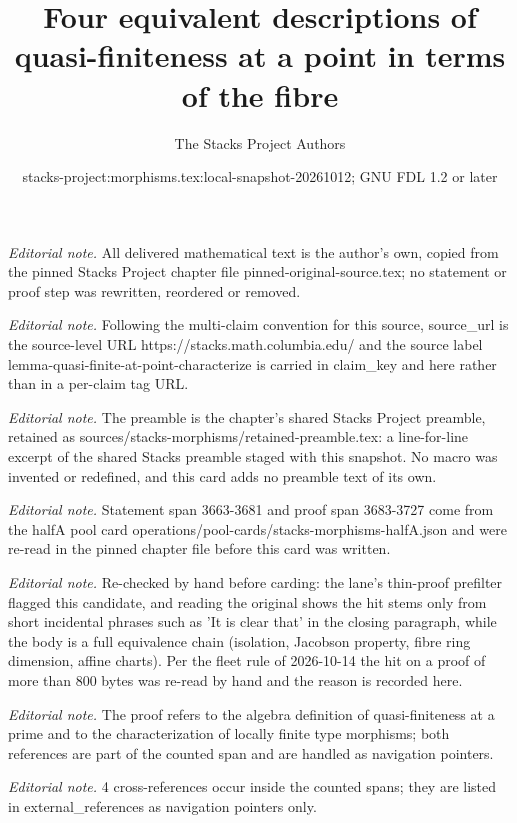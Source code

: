 \documentclass[10pt,a4paper]{amsart}
\title{Four equivalent descriptions of quasi-finiteness at a point in terms of the fibre}
\author{The Stacks Project Authors}
\date{stacks-project:morphisms.tex:local-snapshot-20261012; GNU FDL 1.2 or later}
\theoremstyle{plain}
\theoremstyle{definition}
\theoremstyle{remark}
\numberwithin{equation}{subsection}
\begin{document}
\maketitle
\noindent\textit{Editorial note.} All delivered mathematical text is the author's own, copied from the pinned Stacks Project chapter file pinned-original-source.tex; no statement or proof step was rewritten, reordered or removed.\par\medskip
\noindent\textit{Editorial note.} Following the multi-claim convention for this source, source\_url is the source-level URL https://stacks.math.columbia.edu/ and the source label lemma-quasi-finite-at-point-characterize is carried in claim\_key and here rather than in a per-claim tag URL.\par\medskip
\noindent\textit{Editorial note.} The preamble is the chapter's shared Stacks Project preamble, retained as sources/stacks-morphisms/retained-preamble.tex: a line-for-line excerpt of the shared Stacks preamble staged with this snapshot. No macro was invented or redefined, and this card adds no preamble text of its own.\par\medskip
\noindent\textit{Editorial note.} Statement span 3663-3681 and proof span 3683-3727 come from the halfA pool card operations/pool-cards/stacks-morphisms-halfA.json and were re-read in the pinned chapter file before this card was written.\par\medskip
\noindent\textit{Editorial note.} Re-checked by hand before carding: the lane's thin-proof prefilter flagged this candidate, and reading the original shows the hit stems only from short incidental phrases such as 'It is clear that' in the closing paragraph, while the body is a full equivalence chain (isolation, Jacobson property, fibre ring dimension, affine charts). Per the fleet rule of 2026-10-14 the hit on a proof of more than 800 bytes was re-read by hand and the reason is recorded here.\par\medskip
\noindent\textit{Editorial note.} The proof refers to the algebra definition of quasi-finiteness at a prime and to the characterization of locally finite type morphisms; both references are part of the counted span and are handled as navigation pointers.\par\medskip
\noindent\textit{Editorial note.} 4 cross-references occur inside the counted spans; they are listed in external\_references as navigation pointers only.\par\medskip
\end{document}
